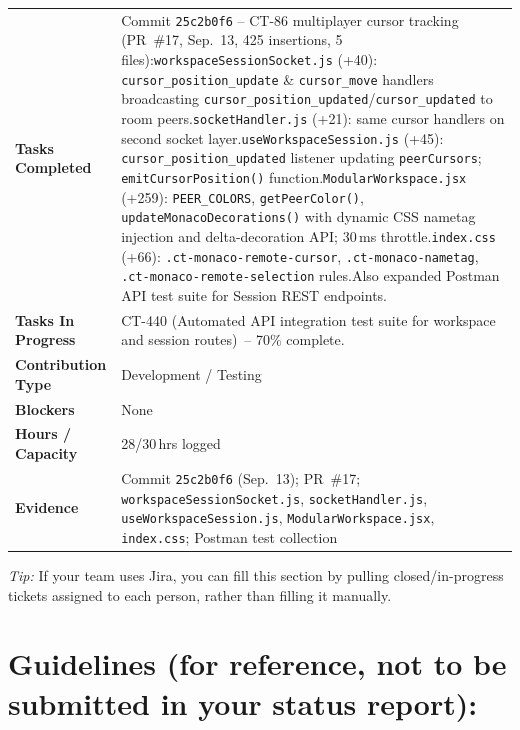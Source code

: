 \documentclass[11pt,a4paper]{article}
\begin{document}
{\small
\begin{tabular}{>{\bfseries}p{} p{}}
\toprule
Tasks Completed & Commit \texttt{25c2b0f6} -- CT-86 multiplayer cursor tracking (PR~\#17, Sep.\ 13, 425 insertions, 5 files):\newline \texttt{workspaceSessionSocket.js} (+40): \texttt{cursor\_position\_update} \& \texttt{cursor\_move} handlers broadcasting \texttt{cursor\_position\_updated}/\texttt{cursor\_updated} to room peers.\newline \texttt{socketHandler.js} (+21): same cursor handlers on second socket layer.\newline \texttt{useWorkspaceSession.js} (+45): \texttt{cursor\_position\_updated} listener updating \texttt{peerCursors}; \texttt{emitCursorPosition()} function.\newline \texttt{ModularWorkspace.jsx} (+259): \texttt{PEER\_COLORS}, \texttt{getPeerColor()}, \texttt{updateMonacoDecorations()} with dynamic CSS nametag injection and delta-decoration API; 30\,ms throttle.\newline \texttt{index.css} (+66): \texttt{.ct-monaco-remote-cursor}, \texttt{.ct-monaco-nametag}, \texttt{.ct-monaco-remote-selection} rules.\newline Also expanded Postman API test suite for Session REST endpoints. \\
Tasks In Progress & CT-440 (Automated API integration test suite for workspace and session routes)~-- 70\% complete. \\
Contribution Type & Development / Testing \\
Blockers & None \\
Hours / Capacity & 28/30\,hrs logged \\
Evidence & Commit \texttt{25c2b0f6} (Sep.\ 13); PR~\#17; \texttt{workspaceSessionSocket.js}, \texttt{socketHandler.js}, \texttt{useWorkspaceSession.js}, \texttt{ModularWorkspace.jsx}, \texttt{index.css}; Postman test collection \\
\bottomrule
\end{tabular}
}

\vspace{6pt}
\noindent
\textit{Tip:} If your team uses Jira, you can fill this section by pulling closed/in-progress tickets assigned to each person, rather than filling it manually.

\pagebreak

\section{Guidelines (for reference, not to be submitted in your status report):}
\end{document}

